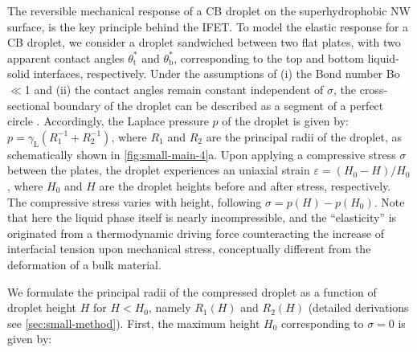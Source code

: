 The reversible mechanical response of a CB droplet on the
superhydrophobic NW surface, is the key principle behind the IFET.
%
To model the elastic response for a CB
droplet, we consider a droplet sandwiched between two flat plates,
with two apparent contact angles \(\theta_{\mathrm{t}}^{*}\) and
\(\theta_{\mathrm{b}}^{*}\), corresponding to the top and bottom
liquid-solid interfaces, respectively. Under the assumptions of (i)
the Bond number Bo\(\ll\)1 and (ii) the contact angles remain
constant independent of \(\sigma\), the cross-sectional boundary of the
droplet can be described as a segment of a perfect circle
\cite{berthier_2012_microdroplet}. Accordingly, the Laplace pressure
\(p\) of the droplet is given by: \(p = \gamma_{\mathrm{L}}
 (R_{1}^{-1} + R_{2}^{-1})\), where \(R_{1}\) and \(R_{2}\) are the
principal radii of the droplet, as schematically shown in 
\autoref{fig:small-main-4}a. Upon applying a compressive stress \(\sigma\) between
the plates, the droplet experiences an uniaxial strain \(\varepsilon =
 (H_{0} - H) / H_{0}\), where \(H_{0}\) and \(H\) are the droplet heights
before and after stress, respectively. The compressive stress varies
with height, following \(\sigma = p(H) - p(H_{0})\). Note that here the
liquid phase itself is nearly incompressible, and the ``elasticity'' is
originated from a thermodynamic driving force counteracting the
increase of interfacial tension upon mechanical stress, conceptually
different from the deformation of a bulk material.

We formulate the principal radii of the compressed droplet as a
function of droplet height \(H\) for \(H < H_{0}\), namely
\(R_{1}(H)\) and \(R_{2}(H)\)  (detailed
derivations see \autoref{sec:small-method}). First, the maximum height
\(H_{0}\) corresponding to \(\sigma=0\) is given by:

